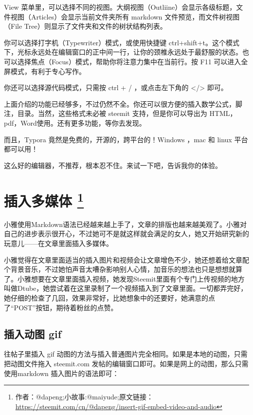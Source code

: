 \documentclass[]{ctexbook}
\begin{document}
View 菜单里，可以选择不同的视图。大纲视图（Outliine）会显示各级标题，文件视图（Articles）会显示当前文件夹所有 markdown 文件预览，而文件树视图（File Tree）则显示了文件夹和文件的树状结构列表。

你可以选择打字机（Typewriter）模式，或使用快捷键 ctrl+shift+t。这个模式下，光标永远处在编辑窗口的正中间一行，让你的颈椎永远处于最舒服的状态。也可以选择焦点（Focus）模式，帮助你将注意力集中在当前行。按 F11 可以进入全屏模式，有利于专心写作。

你还可以选择源代码模式，只需按 ctrl + / ，或点击左下角的 \textless{}/\textgreater{} 即可。

上面介绍的功能已经够多，不过仍然不全。你还可以很方便的插入数学公式，脚注，目录。当然，这些格式未必被 steemit 支持，但是你可以导出为 HTML，pdf，Word使用。还有更多功能，等你去发现。

而且，Typora 竟然是免费的，开源的，跨平台的！Windows ，mac 和 linux 平台都可以用！

这么好的编辑器，不推荐，根本忍不住。来试一下吧，告诉我你的体验。

\hypertarget{crdmb}{%
\section[插入多媒体 ]{\texorpdfstring{插入多媒体 \footnote{作者：@dapeng;小故事:@maiyude;原文链接：\url{https://steemit.com/cn/@dapeng/insert-gif-embed-video-and-audio}}}{插入多媒体 }}\label{crdmb}}

小雅使用Markdown语法已经越来越上手了，文章的排版也越来越美观了。小雅对自己的进步表示很开心，不过她可不是就这样就会满足的女人，她又开始研究新的玩意儿------在文章里面插入多媒体。

小雅觉得在文章里面适当的插入图片和视频会让文章增色不少，她还想着给文章配个背景音乐，不过她怕声音太嘈杂影响别人心情，加音乐的想法也只是想想就算了。小雅想要在文章里面插入视频，她发现Steemit里面有个专门上传视频的地方叫做Dtube，她尝试着在这里录制了一个视频插入到了文章里面。一切都弄完好，她仔细的检查了几回，效果非常好，比她想象中的还要好，她满意的点了``POST''按钮，期待着粉丝的点赞。

\hypertarget{-gif}{%
\subsection{插入动图 gif}\label{-gif}}

往帖子里插入 gif 动图的方法与插入普通图片完全相同。如果是本地的动图，只需把动图文件拖入 steemit.com 发帖的编辑窗口即可。如果是网上的动图，那么只需使用markdown 插入图片的语法即可：
\end{document}
